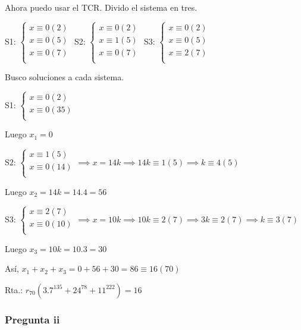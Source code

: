 Ahora puedo usar el TCR. Divido el sistema en tres.

S1: $ \begin{cases}
    x \equiv 0(2) \\
    x \equiv 0(5) \\
    x \equiv 0(7) \\
\end{cases} $
S2: $ \begin{cases}
    x \equiv 0(2) \\
    x \equiv 1(5) \\
    x \equiv 0(7) \\
\end{cases} $
S3: $ \begin{cases}
    x \equiv 0(2) \\
    x \equiv 0(5) \\
    x \equiv 2(7) \\
\end{cases} $

Busco soluciones a cada sistema.

S1: $ \begin{cases}
    x \equiv 0(2) \\
    x \equiv 0(35) \\
\end{cases} $

Luego $ x_1 = 0 $

S2: $ \begin{cases}
    x \equiv 1(5) \\
    x \equiv 0(14) \\
\end{cases} \implies x = 14k \implies 14k \equiv 1(5) \implies k \equiv 4(5) $

Luego $ x_2 = 14k = 14.4 = 56 $

S3: $ \begin{cases}
    x \equiv 2(7) \\
    x \equiv 0(10) \\
\end{cases} \implies x = 10k \implies 10k \equiv 2(7) \implies 3k \equiv 2(7) \implies k \equiv 3(7) $

Luego $ x_3 = 10k = 10.3 = 30 $

Así, $ x_1 + x_2 +x_3 = 0+56+30 = 86 \equiv 16(70) $

Rta.: $ r_{70}(3.7^{135} + 24^{78} + 11^{222}) = 16 $

\subsubsection{Pregunta ii}

